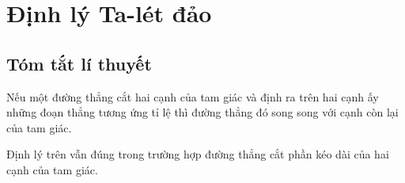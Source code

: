 \section{Định lý Ta-lét đảo}

\subsection{Tóm tắt lí thuyết}
\begin{dl}
	Nếu một đường thẳng cắt hai cạnh của tam giác và định ra trên hai cạnh ấy những đoạn thẳng tương ứng tỉ lệ thì đường thẳng đó song song với cạnh còn lại của tam giác.
\end{dl}

\begin{note}
	Định lý trên vẫn đúng trong trường hợp đường thẳng cắt phần kéo dài của hai cạnh của tam giác.
\end{note}

